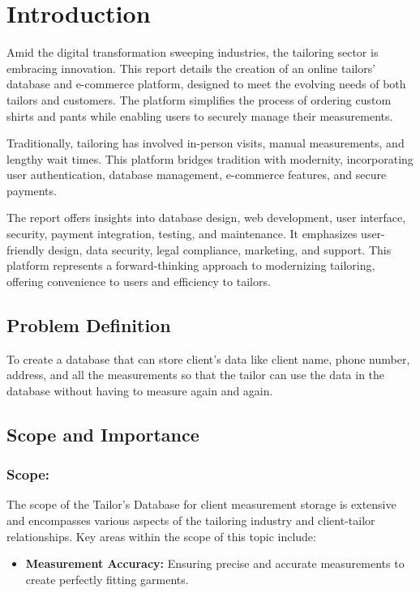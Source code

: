 \documentclass[12pt, letter paper]{report}
\begin{document}
{\chapter{Introduction}
\begin{spacing}{1.5}
Amid the digital transformation sweeping industries, the tailoring sector is embracing innovation. This report details the creation of an online tailors' database and e-commerce platform, designed to meet the evolving needs of both tailors and customers. The platform simplifies the process of ordering custom shirts and pants while enabling users to securely manage their measurements.

Traditionally, tailoring has involved in-person visits, manual measurements, and lengthy wait times. This platform bridges tradition with modernity, incorporating user authentication, database management, e-commerce features, and secure payments.

The report offers insights into database design, web development, user interface, security, payment integration, testing, and maintenance. It emphasizes user-friendly design, data security, legal compliance, marketing, and support. This platform represents a forward-thinking approach to modernizing tailoring, offering convenience to users and efficiency to tailors.
\end{spacing}
\section{Problem Definition} 
\begin{spacing}{1.5}
To create a database that can store client’s data like client name, phone number, address, and all the measurements so that the tailor can use the data in the database without having to measure again and again.
\end{spacing}

\section{Scope and Importance}
\subsection{Scope:}
The scope of the Tailor's Database for client measurement storage is extensive and encompasses various aspects of the tailoring industry and client-tailor relationships. 
Key areas within the scope of this topic include:
\begin{spacing}{1.5}
\begin{itemize}
\item\textbf{Measurement Accuracy:} Ensuring precise and accurate measurements to create perfectly fitting garments.


\end{itemize}
\end{spacing}}
\end{document}
